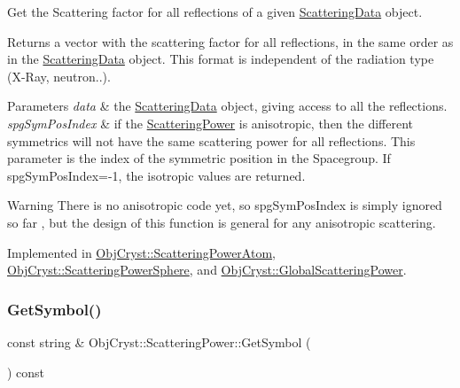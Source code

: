 Get the Scattering factor for all reflections of a given \mbox{\hyperlink{class_obj_cryst_1_1_scattering_data}{Scattering\+Data}} object. 

\begin{DoxyReturn}{Returns}
a vector with the scattering factor for all reflections, in the same order as in the \mbox{\hyperlink{class_obj_cryst_1_1_scattering_data}{Scattering\+Data}} object. This format is independent of the radiation type (X-\/\+Ray, neutron..). 
\end{DoxyReturn}

\begin{DoxyParams}{Parameters}
{\em data} & the \mbox{\hyperlink{class_obj_cryst_1_1_scattering_data}{Scattering\+Data}} object, giving access to all the reflections. \\
\hline
{\em spg\+Sym\+Pos\+Index} & if the \mbox{\hyperlink{class_obj_cryst_1_1_scattering_power}{Scattering\+Power}} is anisotropic, then the different symmetrics will not have the same scattering power for all reflections. This parameter is the index of the symmetric position in the Spacegroup. If spg\+Sym\+Pos\+Index=-\/1, the isotropic values are returned. \\
\hline
\end{DoxyParams}
\begin{DoxyWarning}{Warning}
There is no anisotropic code yet, so spg\+Sym\+Pos\+Index is simply ignored so far , but the design of this function is general for any anisotropic scattering. 
\end{DoxyWarning}


Implemented in \mbox{\hyperlink{class_obj_cryst_1_1_scattering_power_atom_a2ae5ca3726d70f371acfbafc97d300ab}{Obj\+Cryst\+::\+Scattering\+Power\+Atom}}, \mbox{\hyperlink{class_obj_cryst_1_1_scattering_power_sphere_aad2a92da56fe7e50e585a0ad24da5c83}{Obj\+Cryst\+::\+Scattering\+Power\+Sphere}}, and \mbox{\hyperlink{class_obj_cryst_1_1_global_scattering_power_af81844742d8cfdca7dec979a08e4abf0}{Obj\+Cryst\+::\+Global\+Scattering\+Power}}.

\mbox{\label{class_obj_cryst_1_1_scattering_power_afc2a98469a75c58259d4f81cd30510b9}} 
\subsubsection{\texorpdfstring{GetSymbol()}{GetSymbol()}}
{\footnotesize\ttfamily const string \& Obj\+Cryst\+::\+Scattering\+Power\+::\+Get\+Symbol (\begin{DoxyParamCaption}{ }\end{DoxyParamCaption}) const\hspace{0.3cm}{\ttfamily [virtual]}}



